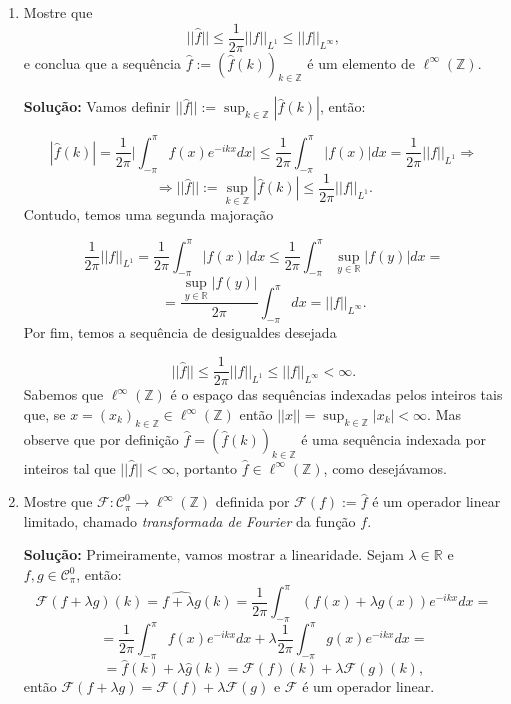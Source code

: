 \documentclass{article}
\begin{document}
\begin{enumerate}
\begin{enumerate}
			\item Mostre que
			$$
			||\hat{f}|| \leq \frac{1}{2\pi}||f||_{L^{1}}\leq ||f||_{L^{\infty}},
			$$
			e conclua que a sequência $\hat{f} := (\hat{f}(k))_{k \in \mathbb{Z}}$ é um elemento de $\ell^{\infty}(\mathbb{Z})$.
			
			\textbf{Solução:} Vamos definir $||\hat{f}||:= \sup_{k \in \mathbb{Z}}|\hat{f}(k)|$, então:
			
			$$
			|\hat{f}(k)| = \frac{1}{2\pi} \Big |\int_{-\pi}^{\pi} f(x)e^{-ikx}dx \Big | \leq \frac{1}{2\pi} \int_{-\pi}^{\pi} |f(x)|dx = \frac{1}{2\pi}||f||_{L^{1}} \Rightarrow  
			$$
			$$
			\Rightarrow ||\hat{f}||:= \sup_{k \in \mathbb{Z}}|\hat{f}(k)| \leq \frac{1}{2\pi}||f||_{L^{1}}.
			$$
			Contudo, temos uma segunda majoração
			
			$$
			\frac{1}{2\pi}||f||_{L^{1}}= \frac{1}{2\pi} \int_{-\pi}^{\pi} |f(x)|dx \leq \frac{1}{2\pi} \int_{-\pi}^{\pi} \sup_{y \in \mathbb{R}}|f(y)|dx = 
			$$
			$$
			= \frac{\sup_{y \in \mathbb{R}}|f(y)|}{2\pi} \int_{-\pi}^{\pi} dx = ||f||_{L^{\infty}}.
			$$
			Por fim, temos a sequência de desigualdes desejada
			
			$$
			||\hat{f}|| \leq \frac{1}{2\pi}||f||_{L^{1}}\leq ||f||_{L^{\infty}} < \infty.
			$$
			Sabemos que $\ell^{\infty}(\mathbb{Z})$ é o espaço das sequências indexadas pelos inteiros tais que, se $x = (x_{k})_{k \in \mathbb{Z}} \in \ell^{\infty}(\mathbb{Z})$ então $||x|| = \sup_{k \in \mathbb{Z}}|x_{k}| < \infty$. Mas observe que por definição $\hat{f} = (\hat{f}(k))_{k \in \mathbb{Z}}$ é uma sequência indexada por inteiros tal que $||\hat{f}|| <\infty$, portanto $\hat{f} \in \ell^{\infty}(\mathbb{Z})$, como desejávamos.
			
			\item Mostre que $\mathcal{F}: \mathcal{C}^{0}_{\pi} \to \ell^{\infty}(\mathbb{Z})$ definida por $\mathcal{F}(f) := \hat{f}$ é um operador linear limitado, chamado \textit{transformada de Fourier} da função $f$.
			
			\textbf{Solução:} Primeiramente, vamos mostrar a linearidade. Sejam $\lambda \in \mathbb{R}$ e $f, g \in \mathcal{C}^{0}_{\pi}$, então:
			$$
			\mathcal{F}(f+\lambda g)(k) = \widehat{f+\lambda g}(k) =  \frac{1}{2\pi}\int_{-\pi}^{\pi} (f(x)+\lambda g(x))e^{-ikx}dx = 
			$$
			$$
			= \frac{1}{2\pi}\int_{-\pi}^{\pi} f(x)e^{-ikx}dx + \lambda \frac{1}{2\pi}\int_{-\pi}^{\pi} g(x)e^{-ikx}dx = 
			$$
			$$
			= \hat{f}(k) +\lambda \hat{g}(k) = \mathcal{F}(f)(k) + \lambda \mathcal{F}(g)(k),
			$$
			então $\mathcal{F}(f+\lambda g) = \mathcal{F}(f) + \lambda \mathcal{F}(g)$ e $\mathcal{F}$ é um operador linear.
		\end{enumerate}
		
	\end{enumerate}
		
\end{document}
